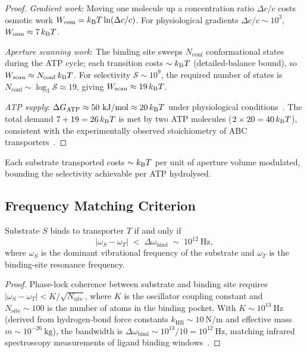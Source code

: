 \begin{proof}
\emph{Gradient work}: Moving one molecule up a concentration ratio
$\Delta c/c$ costs osmotic work $W_{\mathrm{osm}}=k_{\mathrm{B}} T\ln(\Delta c/c)$.
For physiological gradients $\Delta c/c\sim 10^3$,
$W_{\mathrm{osm}}\approx 7\,k_{\mathrm{B}} T$.

\emph{Aperture scanning work}: The binding site sweeps $N_{\mathrm{conf}}$
conformational states during the ATP cycle; each transition costs $\sim k_{\mathrm{B}} T$
(detailed-balance bound), so $W_{\mathrm{scan}}\approx N_{\mathrm{conf}}\,k_{\mathrm{B}} T$.
For selectivity $\mathcal{S}\sim 10^9$, the required number of states is
$N_{\mathrm{conf}}\sim\log_{3}\mathcal{S}\approx 19$, giving
$W_{\mathrm{scan}}\approx 19\,k_{\mathrm{B}} T$.

\emph{ATP supply}: $\Delta G_{\mathrm{ATP}}\approx 50~\mathrm{kJ/mol}
\approx 20\,k_{\mathrm{B}} T$ under physiological conditions~\citep{jarzynski2011equalities}.
The total demand $7+19=26\,k_{\mathrm{B}} T$ is met by two ATP molecules
($2\times 20=40\,k_{\mathrm{B}} T$), consistent with the experimentally observed
stoichiometry of ABC transporters~\citep{hollenstein2007structure}.
\end{proof}

\begin{corollary}
Each substrate transported costs $\sim k_{\mathrm{B}} T$ per unit of aperture volume
modulated, bounding the selectivity achievable per ATP hydrolysed.
\end{corollary}

\subsection{Frequency Matching Criterion}

\begin{theorem}
\label{thm:ch03-freq-matching}
Substrate $S$ binds to transporter $T$ if and only if
\begin{equation}
    |\omega_S - \omega_T| \;<\; \Delta\omega_{\mathrm{bind}} \;\sim\; 10^{12}~\mathrm{Hz},
    \label{eq:ch03-freq-match}
\end{equation}
where $\omega_S$ is the dominant vibrational frequency of the substrate and
$\omega_T$ is the binding-site resonance frequency.
\end{theorem}

\begin{proof}
Phase-lock coherence between substrate and binding site requires
$|\omega_S-\omega_T|<K/\sqrt{N_{\mathrm{site}}}$, where $K$ is the
oscillator coupling constant and $N_{\mathrm{site}}\sim 100$ is the number
of atoms in the binding pocket.  With $K\sim 10^{13}~\mathrm{Hz}$
(derived from hydrogen-bond force constants $k_{\mathrm{HB}}\sim
10~\mathrm{N/m}$ and effective mass $m\sim 10^{-26}~\mathrm{kg}$), the
bandwidth is $\Delta\omega_{\mathrm{bind}}\sim 10^{13}/10=10^{12}~\mathrm{Hz}$,
matching infrared spectroscopy measurements of ligand binding
windows~\citep{pikovsky2001synchronization}.
\end{proof}

